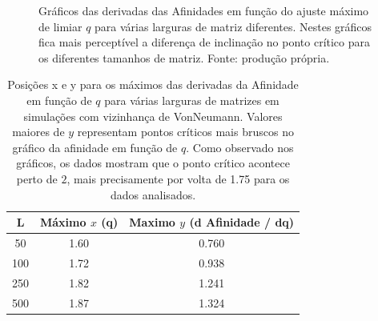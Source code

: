 \documentclass[
	12pt,				%
	openright,			%
	twoside,			%
	a4paper,			%
	english,			%
	french,				%
	spanish,			%
	brazil				%
	]{abntex2}
\begin{document}
\begin{figure}
  \centering

  \caption{Gráficos das derivadas das Afinidades em função do ajuste máximo de limiar $q$ para várias larguras de matriz diferentes. Nestes gráficos fica mais perceptível a diferença de inclinação no ponto crítico para os diferentes tamanhos de matriz. Fonte: produção própria.}
  \label{fig:DerivadasAfinidades}
\end{figure}

\begin{table}
  \centering
  \caption{Posições x e y para os máximos das derivadas da Afinidade em função de $q$ para várias larguras de matrizes em simulações com vizinhança de VonNeumann. Valores maiores de $y$ representam pontos críticos mais bruscos no gráfico da afinidade em função de $q$. Como observado nos gráficos, os dados mostram que o ponto crítico acontece perto de $2$, mais precisamente por volta de 1.75 para os dados analisados.}
  \label{tab:maximosAfinidadeVonNeumann}
  \begin{tabular}{ccc}\toprule
    L	& Máximo $x$ (q)	& Maximo $y$ (d Afinidade / dq)\\\midrule\midrule
    50	& 1.60 &	0.760\\
    100	& 1.72 &	0.938\\
    250	& 1.82 &	1.241\\
    500	& 1.87 &	1.324\\\bottomrule
  \end{tabular}
\end{table}
\end{document}
